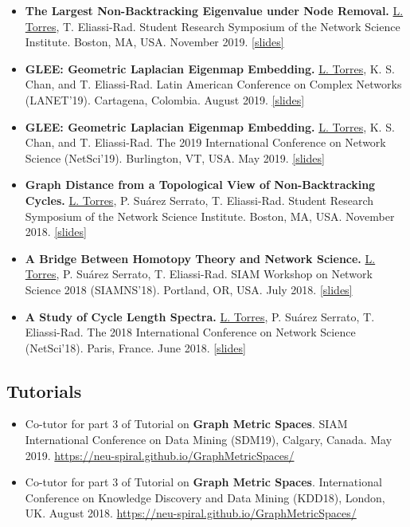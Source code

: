 \documentclass[12pt,]{scrartcl}
\newenvironment{myitemize}
{ \begin{itemize}
    \setlength{\itemsep}{5pt}
    \setlength{\parskip}{0pt}
    \setlength{\parsep}{0pt}     }
{ \end{itemize}                  }
\begin{document}
\begin{myitemize}
\leftskip-0.25in %

\item \textbf{The Largest Non-Backtracking Eigenvalue under Node Removal.} \underline{L. Torres}, T. Eliassi-Rad. Student Research Symposium of the Network Science Institute. Boston, MA, USA. November 2019. \href{http://leotrs.com/static/symposium2019.pdf}{[slides]}

\item \textbf{GLEE: Geometric Laplacian Eigenmap Embedding.} \underline{L. Torres}, K. S. Chan, and T. Eliassi-Rad. Latin American Conference on Complex Networks (LANET'19). Cartagena, Colombia. August 2019. \href{http://leotrs.com/static/GLEE_lanet19.pdf}{[slides]}

\item \textbf{GLEE: Geometric Laplacian Eigenmap Embedding.} \underline{L. Torres}, K. S. Chan, and T. Eliassi-Rad. The 2019 International Conference on Network Science (NetSci'19). Burlington, VT, USA. May 2019. \href{http://leotrs.com/static/GLEE_netsci19.pdf}{[slides]}

\item \textbf{Graph Distance from a Topological View of Non-Backtracking Cycles.} \underline{L. Torres}, P. Suárez Serrato, T. Eliassi-Rad. Student Research Symposium of the Network Science Institute. Boston, MA, USA. November 2018. \href{http://leotrs.com/static/netsci18.pdf}{[slides]}

\item \textbf{A Bridge Between Homotopy Theory and Network Science.} \underline{L. Torres}, P. Suárez Serrato, T. Eliassi-Rad. SIAM Workshop on Network Science 2018 (SIAMNS'18). Portland, OR, USA. July 2018. \href{http://leotrs.com/static/siamns18.pdf}{[slides]}

\item \textbf{A Study of Cycle Length Spectra.} \underline{L. Torres}, P. Suárez Serrato, T. Eliassi-Rad. The 2018 International Conference on Network Science (NetSci'18). Paris, France. June 2018. \href{http://leotrs.com/static/netsci18.pdf}{[slides]}

\end{myitemize}

\subsection{Tutorials}\label{tutorials}

\begin{myitemize}
\leftskip-0.25in

\item Co-tutor for part 3 of Tutorial on \textbf{Graph Metric Spaces}. SIAM International Conference on Data Mining (SDM19), Calgary, Canada. May 2019. \url{https://neu-spiral.github.io/GraphMetricSpaces/}

\item Co-tutor for part 3 of Tutorial on \textbf{Graph Metric Spaces}. International Conference on Knowledge Discovery and Data Mining (KDD18), London, UK. August 2018. \url{https://neu-spiral.github.io/GraphMetricSpaces/}

\end{myitemize}
\end{document}
